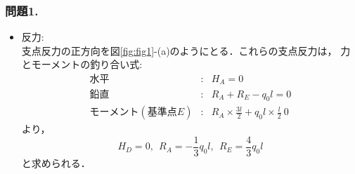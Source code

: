 \documentclass[10pt,a4j]{jarticle}
\begin{document}
\subsubsection*{問題1.}
\begin{itemize}
\item
	{\rm 反力:}\\
	支点反力の正方向を図\ref{fig:fig1}-(a)のようにとる．これらの支点反力は，
	力とモーメントの釣り合い式:
	\begin{eqnarray*}
		水平 &:& H_A=0 \\
		鉛直 &:& R_A+R_E-q_0l=0 \\
		モーメント(基準点E) &:& R_A \times \frac{3l}{2}+
		q_0l\times \frac{l}{2}~0
	\end{eqnarray*}
	より，
	\[
		H_D=0, \ \ 
		R_A=-\frac{1}{3}q_0l, \ \ R_E=\frac{4}{3}q_0l
	\]	
	と求められる．\\


\end{itemize}
\end{document}
